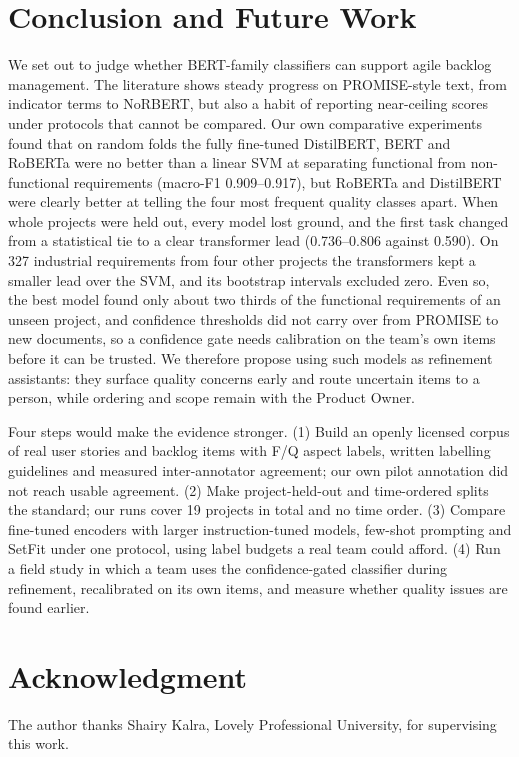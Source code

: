 \documentclass[conference,10pt,letterpaper]{IEEEtran}
\begin{document}
\section{Conclusion and Future Work}\label{sec:concl}
We set out to judge whether BERT-family classifiers can support agile backlog management. The literature shows steady progress on PROMISE-style text, from indicator terms to NoRBERT, but also a habit of reporting near-ceiling scores under protocols that cannot be compared. Our own comparative experiments found that on random folds the fully fine-tuned DistilBERT, BERT and RoBERTa were no better than a linear SVM at separating functional from non-functional requirements (macro-F1 0.909–0.917), but RoBERTa and DistilBERT were clearly better at telling the four most frequent quality classes apart. When whole projects were held out, every model lost ground, and the first task changed from a statistical tie to a clear transformer lead (0.736–0.806 against 0.590). On 327 industrial requirements from four other projects the transformers kept a smaller lead over the SVM, and its bootstrap intervals excluded zero. Even so, the best model found only about two thirds of the functional requirements of an unseen project, and confidence thresholds did not carry over from PROMISE to new documents, so a confidence gate needs calibration on the team's own items before it can be trusted. We therefore propose using such models as refinement assistants: they surface quality concerns early and route uncertain items to a person, while ordering and scope remain with the Product Owner.

Four steps would make the evidence stronger. (1) Build an openly licensed corpus of real user stories and backlog items with F/Q aspect labels, written labelling guidelines and measured inter-annotator agreement; our own pilot annotation did not reach usable agreement. (2) Make project-held-out and time-ordered splits the standard; our runs cover 19 projects in total and no time order. (3) Compare fine-tuned encoders with larger instruction-tuned models, few-shot prompting and SetFit under one protocol, using label budgets a real team could afford. (4) Run a field study in which a team uses the confidence-gated classifier during refinement, recalibrated on its own items, and measure whether quality issues are found earlier.

\section*{Acknowledgment}
The author thanks Shairy Kalra, Lovely Professional University, for supervising this work.



\end{document}
